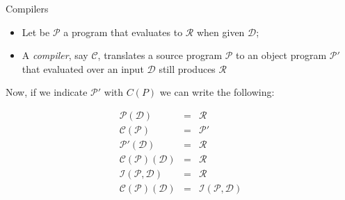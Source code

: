 \documentclass[aspectratio=169,dvipsnames]{beamer}
\renewcommand{\P}{\ensuremath{\mathcal{P}}\xspace}
\newcommand{\C}{\ensuremath{\mathcal{C}}\xspace}
\newcommand{\I}{\ensuremath{\mathcal{I}}\xspace}
\newcommand{\D}{\ensuremath{\mathcal{D}}\xspace}
\newcommand{\R}{\ensuremath{\mathcal{R}}\xspace}
\begin{document}
\begin{frame}{Compilers}

    \begin{itemize}

        \item 
            Let be \P a program that evaluates to \R when given \D;
        \item  
            A \textit{compiler}, say $\mathcal{C}$, translates a source program
            $\mathcal{P}$ to an object program $\P'$ that
            evaluated over an input \D still produces \R
        
    
    
    \end{itemize}




    \begin{center}
    
        
    \end{center}

\end{frame}

\begin{frame}
    
    Now, if we indicate $\P'$ with $C(P)$ we can write the following:

    \begin{eqnarray*}        
        \P(\D) &=& \R\\
        \C(\P) &=& \P'\\
        \P'(\D) &=& \R\\
        \C(\P)(\D) &=& \R\\
        \I(\P, \D) &=& \R\\
        \C(\P)(\D) &=& \I(\P, \D) \\
    \end{eqnarray*}
    
\end{frame}
\end{document}
